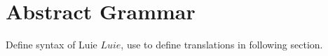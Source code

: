 \section{Abstract Grammar}
\label{sec:concept_abstractGrammar}
Define syntax of Luie $Luie$, use to define translations in following section.